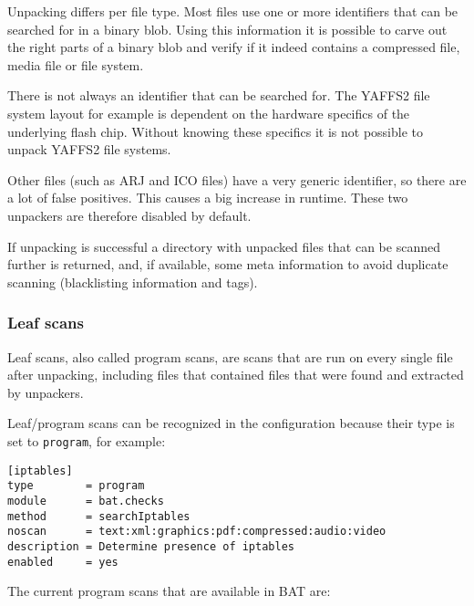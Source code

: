 \documentclass[10pt]{article}
\begin{document}
Unpacking differs per file type. Most files use one or more identifiers that
can be searched for in a binary blob. Using this information it is possible
to carve out the right parts of a binary blob and verify if it indeed contains
a compressed file, media file or file system.

There is not always an identifier that can be searched for. The YAFFS2 file
system layout for example is dependent on the hardware specifics of the
underlying flash chip. Without knowing these specifics it is not possible to
unpack YAFFS2 file systems.

Other files (such as ARJ and ICO files) have a very generic identifier, so
there are a lot of false positives. This causes a big increase in runtime.
These two unpackers are therefore disabled by default.

If unpacking is successful a directory with unpacked files that can be
scanned further is returned, and, if available, some meta information to avoid
duplicate scanning (blacklisting information and tags).

\subsubsection{Leaf scans}

Leaf scans, also called program scans, are scans that are run on every single
file after unpacking, including files that contained files that were found
and extracted by unpackers.

Leaf/program scans can be recognized in the configuration because their type is
set to \texttt{program}, for example:

\begin{verbatim}
[iptables]
type        = program
module      = bat.checks
method      = searchIptables
noscan      = text:xml:graphics:pdf:compressed:audio:video
description = Determine presence of iptables
enabled     = yes
\end{verbatim}

The current program scans that are available in BAT are:
\end{document}
